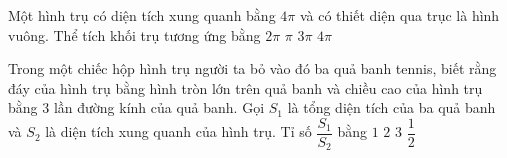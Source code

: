 \begin{ex}%
	Một hình trụ có diện tích xung quanh bằng $4\pi$ và có thiết diện qua trục là hình vuông. Thể tích khối trụ tương ứng bằng
	\choice
	{\True $2\pi$}
	{$\pi$}
	{$3\pi$}
	{$4\pi$}
\end{ex}
\begin{ex}%
	Trong một chiếc hộp hình trụ người ta bỏ vào đó ba quả banh tennis, biết rằng đáy của hình trụ bằng hình tròn lớn trên quả banh và chiều cao của hình trụ bằng $3$ lần đường kính của quả banh. Gọi $S_1$ là tổng diện tích của ba quả banh và $S_2$ là diện tích xung quanh của hình trụ. Tỉ số $\dfrac{S_1}{S_2}$ bằng
	\choice
	{\True $1$}
	{$2$}
	{$3$}
	{$\dfrac{1}{2}$}
\end{ex}
